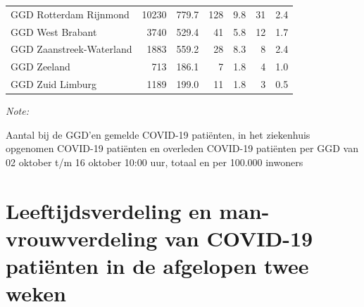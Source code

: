 \documentclass[
  english,
  man,floatsintext]{apa6}
\begin{document}
\begin{table}[H]
\begin{threeparttable}
\begin{tabular}{lrrrrrr}
GGD Rotterdam Rijnmond & 10230 & 779.7 & 128 & 9.8 & 31 & 2.4\\
GGD West Brabant & 3740 & 529.4 & 41 & 5.8 & 12 & 1.7\\
GGD Zaanstreek-Waterland & 1883 & 559.2 & 28 & 8.3 & 8 & 2.4\\
GGD Zeeland & 713 & 186.1 & 7 & 1.8 & 4 & 1.0\\
GGD Zuid Limburg & 1189 & 199.0 & 11 & 1.8 & 3 & 0.5\\
\bottomrule
\end{tabular}
\begin{tablenotes}
\item \textit{Note: } 
\item Aantal bij de GGD’en gemelde COVID-19 patiënten, in het ziekenhuis opgenomen COVID-19 patiënten en overleden COVID-19 patiënten per GGD van 02 oktober t/m 16 oktober 10:00 uur, totaal en per 100.000 inwoners
\end{tablenotes}
\end{threeparttable}
\endgroup{}
\end{table}

\newpage

\hypertarget{leeftijdsverdeling-en-man-vrouwverdeling-van-covid-19-patiuxebnten-in-de-afgelopen-twee-weken}{%
\section{Leeftijdsverdeling en man-vrouwverdeling van COVID-19 patiënten in de afgelopen twee weken}\label{leeftijdsverdeling-en-man-vrouwverdeling-van-covid-19-patiuxebnten-in-de-afgelopen-twee-weken}}
\end{document}
